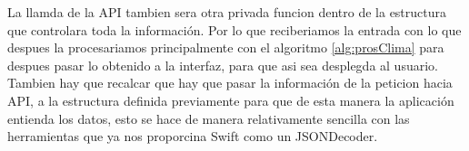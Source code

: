 La llamda de la API tambien sera otra privada funcion dentro de la estructura que controlara toda la información. Por lo que reciberiamos la entrada
con lo que despues la procesariamos principalmente con el algoritmo \ref{alg:prosClima} para despues pasar lo obtenido a la interfaz, para que
asi sea desplegda al usuario. Tambien hay que recalcar que hay que pasar la información de la peticion hacia API, a la estructura definida previamente
para que de esta manera la aplicación entienda los datos, esto se hace de manera relativamente sencilla con las herramientas que ya nos
proporcina Swift como un JSONDecoder.